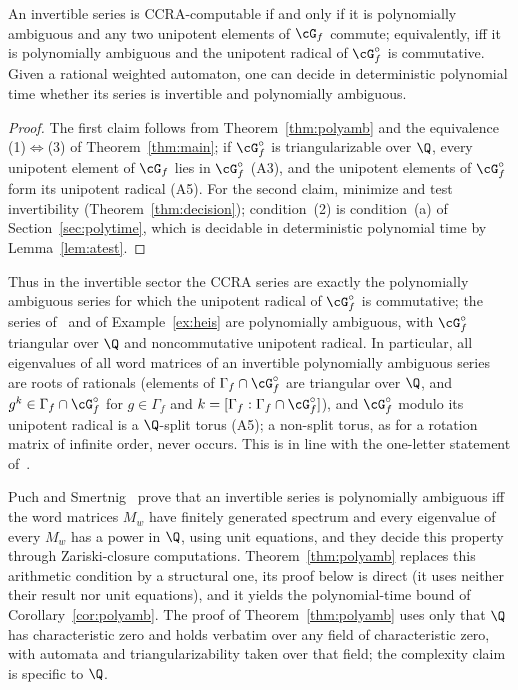\begin{corollary}\label{cor:polyamb}
An invertible series is CCRA-computable if and only if it is polynomially ambiguous and any two
unipotent elements of $\cG_f$ commute; equivalently, iff it is polynomially ambiguous and the
unipotent radical of $\cG_f^\circ$ is commutative. Given a rational weighted automaton, one can
decide in deterministic polynomial time whether its series is invertible and polynomially ambiguous.
\end{corollary}
\begin{proof}
The first claim follows from Theorem~\ref{thm:polyamb} and the equivalence (1)$\Leftrightarrow$(3) of
Theorem~\ref{thm:main}; if $\cG_f^\circ$ is triangularizable over $\Q$, every unipotent
element of $\cG_f$ lies in $\cG_f^\circ$ (A3), and the unipotent elements of $\cG_f^\circ$ form its
unipotent radical (A5). For the second claim, minimize and test invertibility
(Theorem~\ref{thm:decision}); condition~(2) is condition~(a) of Section~\ref{sec:polytime}, which
is decidable in deterministic polynomial time by Lemma~\ref{lem:atest}.
\end{proof}

Thus in the invertible sector the CCRA series are exactly the polynomially ambiguous series for which
the unipotent radical of $\cG_f^\circ$ is commutative; the series of~\cite[Example~17]{MPSfull} and of
Example~\ref{ex:heis} are polynomially ambiguous, with $\cG_f^\circ$ triangular over $\Q$ and
noncommutative unipotent radical. In particular, all eigenvalues of all word matrices of an
invertible polynomially ambiguous series are roots of rationals (elements of
$\Gamma_f\cap\cG_f^\circ$ are triangular over $\Q$, and $g^k\in\Gamma_f\cap\cG_f^\circ$ for
$g\in\Gamma_f$ and $k=[\Gamma_f:\Gamma_f\cap\cG_f^\circ]$), and $\cG_f^\circ$ modulo its unipotent radical
is a $\Q$-split torus (A5); a non-split torus, as for a rotation matrix of infinite order, never occurs.
This is in line with the one-letter statement of~\cite{BFLM22}.

\begin{remark}\label{rem:polyamb-ps}
Puch and Smertnig~\cite[Theorem~1.6]{PS24} prove that an invertible series is polynomially
ambiguous iff the word matrices $M_w$ have finitely generated spectrum and every eigenvalue of every
$M_w$ has a power in $\Q$, using unit equations, and they decide this property through
Zariski-closure computations. Theorem~\ref{thm:polyamb} replaces this arithmetic condition by a
structural one, its proof below is direct (it uses neither their result nor unit equations), and it
yields the polynomial-time bound of Corollary~\ref{cor:polyamb}. The proof of Theorem~\ref{thm:polyamb}
uses only that $\Q$ has characteristic zero and holds verbatim over any field of characteristic zero,
with automata and triangularizability taken over that field; the complexity claim is specific to $\Q$.
\end{remark}

